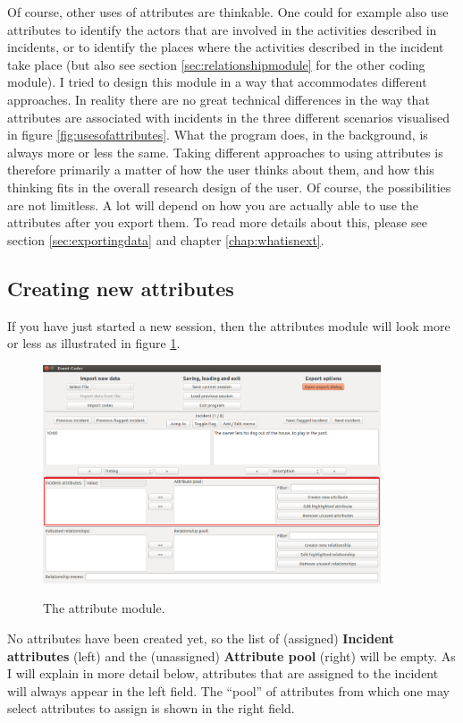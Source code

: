 \documentclass{memoir}
\begin{document}
Of course, other uses of attributes are thinkable. One could for example also use attributes to identify the actors that are involved in the activities described in incidents, or to identify the places where the activities described in the incident take place (but also see section \ref{sec:relationshipmodule} for the other coding module). I tried to design this module in a way that accommodates different approaches. In reality there are no great technical differences in the way that attributes are associated with incidents in the three different scenarios visualised in figure \ref{fig:usesofattributes}. What the program does, in the background, is always more or less the same. Taking different approaches to using attributes is therefore primarily a matter of how the user thinks about them, and how this thinking fits in the overall research design of the user. Of course, the possibilities are not limitless. A lot will depend on how you are actually able to use the attributes after you export them. To read more details about this, please see section \ref{sec:exportingdata} and chapter \ref{chap:whatisnext}.

\subsection{Creating new attributes}
\label{sec:creatingnewattributes}

If you have just started a new session, then the attributes module will look more or less as illustrated in figure \ref{fig:attributemodule}.

\begin{figure}[h!]
  \centering
  \caption{The attribute module.}
  \includegraphics[width=100mm]{Screenshot_7.pdf}
  \label{fig:attributemodule}
\end{figure}

No attributes have been created yet, so the list of (assigned) \textbf{Incident attributes} (left) and the (unassigned) \textbf{Attribute pool} (right) will be empty. As I will explain in more detail below, attributes that are assigned to the incident will always appear in the left field. The ``pool'' of attributes from which one may select attributes to assign is shown in the right field.
\end{document}
